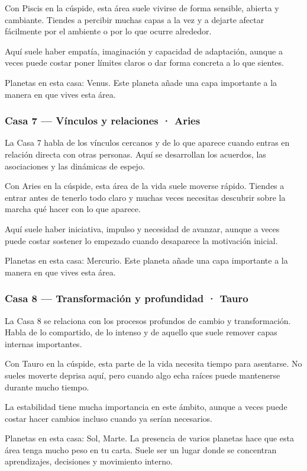 \documentclass[11pt,a4paper]{article}
\begin{document}
Con Piscis en la cúspide, esta área suele vivirse de forma sensible, abierta y cambiante. Tiendes a percibir muchas capas a la vez y a dejarte afectar fácilmente por el ambiente o por lo que ocurre alrededor.

Aquí suele haber empatía, imaginación y capacidad de adaptación, aunque a veces puede costar poner límites claros o dar forma concreta a lo que sientes.

Planetas en esta casa: Venus. Este planeta añade una capa importante a la manera en que vives esta área.

\subsubsection*{Casa 7 — Vínculos y relaciones · Aries}
La Casa 7 habla de los vínculos cercanos y de lo que aparece cuando entras en relación directa con otras personas. Aquí se desarrollan los acuerdos, las asociaciones y las dinámicas de espejo.

Con Aries en la cúspide, esta área de la vida suele moverse rápido. Tiendes a entrar antes de tenerlo todo claro y muchas veces necesitas descubrir sobre la marcha qué hacer con lo que aparece.

Aquí suele haber iniciativa, impulso y necesidad de avanzar, aunque a veces puede costar sostener lo empezado cuando desaparece la motivación inicial.

Planetas en esta casa: Mercurio. Este planeta añade una capa importante a la manera en que vives esta área.

\subsubsection*{Casa 8 — Transformación y profundidad · Tauro}
La Casa 8 se relaciona con los procesos profundos de cambio y transformación. Habla de lo compartido, de lo intenso y de aquello que suele remover capas internas importantes.

Con Tauro en la cúspide, esta parte de la vida necesita tiempo para asentarse. No sueles moverte deprisa aquí, pero cuando algo echa raíces puede mantenerse durante mucho tiempo.

La estabilidad tiene mucha importancia en este ámbito, aunque a veces puede costar hacer cambios incluso cuando ya serían necesarios.

Planetas en esta casa: Sol, Marte. La presencia de varios planetas hace que esta área tenga mucho peso en tu carta. Suele ser un lugar donde se concentran aprendizajes, decisiones y movimiento interno.
\end{document}
